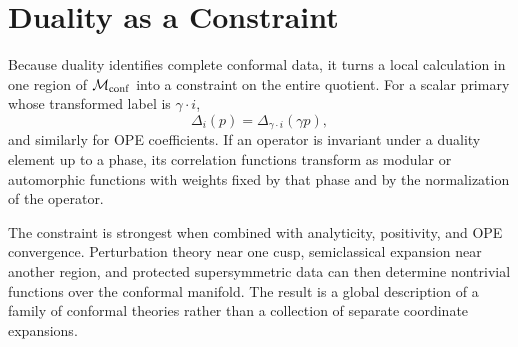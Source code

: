 \section{Duality as a Constraint}

Because duality identifies complete conformal data, it turns a local
calculation in one region of \(\mathcal M_{\rm conf}\) into a constraint on
the entire quotient.  For a scalar primary whose transformed label is
\(\gamma\cdot i\),
\[
  \Delta_i(p)
  =
  \Delta_{\gamma\cdot i}(\gamma p),
\]
and similarly for OPE coefficients.  If an operator is invariant under a
duality element up to a phase, its correlation functions transform as modular
or automorphic functions with weights fixed by that phase and by the
normalization of the operator.

The constraint is strongest when combined with analyticity, positivity, and
OPE convergence.  Perturbation theory near one cusp, semiclassical expansion
near another region, and protected supersymmetric data can then determine
nontrivial functions over the conformal manifold.  The result is a global
description of a family of conformal theories rather than a collection of
separate coordinate expansions.
